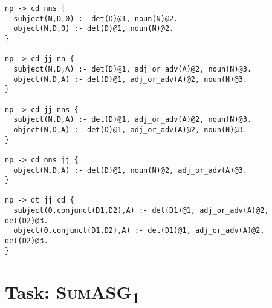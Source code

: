 \begin{lstlisting}
np -> cd nns {
  subject(N,D,0) :- det(D)@1, noun(N)@2.
  object(N,D,0) :- det(D)@1, noun(N)@2.
}

np -> cd jj nn {
  subject(N,D,A) :- det(D)@1, adj_or_adv(A)@2, noun(N)@3.
  object(N,D,A) :- det(D)@1, adj_or_adv(A)@2, noun(N)@3.
}

np -> cd jj nns {
  subject(N,D,A) :- det(D)@1, adj_or_adv(A)@2, noun(N)@3.
  object(N,D,A) :- det(D)@1, adj_or_adv(A)@2, noun(N)@3.
}

np -> cd nns jj {
  object(N,D,A) :- det(D)@1, noun(N)@2, adj_or_adv(A)@3.
}

np -> dt jj cd {
  subject(0,conjunct(D1,D2),A) :- det(D1)@1, adj_or_adv(A)@2, det(D2)@3.
  object(0,conjunct(D1,D2),A) :- det(D1)@1, adj_or_adv(A)@2, det(D2)@3.
}
\end{lstlisting}

\vspace{5pt}

\section{Task: \textsc{SumASG\textsubscript{1}}}
\label{sec:appendix_asg_1}

